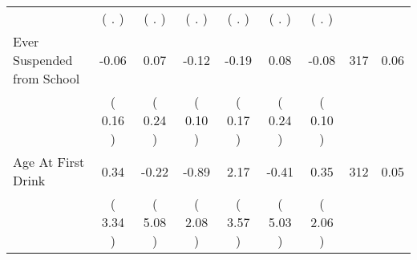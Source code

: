 \begin{tabular}{lcccccccc}
 & (        . ) & (        . ) & (        . ) & (        . ) & (        . ) & (        . ) & \\
Ever Suspended from School &     -0.06 &      0.07 &     -0.12 &     -0.19 &      0.08 &     -0.08 & 317 &       0.06 \\ 
 & (     0.16 ) & (     0.24 ) & (     0.10 ) & (     0.17 ) & (     0.24 ) & (     0.10 ) & \\
Age At First Drink &      0.34 &     -0.22 &     -0.89 &      2.17 &     -0.41 &      0.35 & 312 &       0.05 \\ 
 & (     3.34 ) & (     5.08 ) & (     2.08 ) & (     3.57 ) & (     5.03 ) & (     2.06 ) & \\
\bottomrule
\end{tabular}
